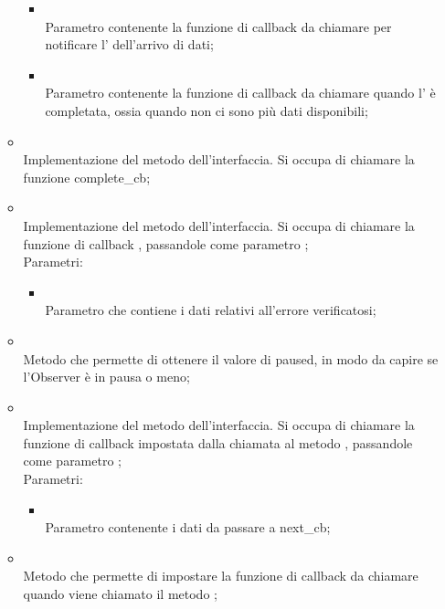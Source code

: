 \begin{itemize}
\begin{itemize}
\begin{itemize}
			\item {} \\
			Parametro contenente la funzione di callback da chiamare per notificare l' dell'arrivo di dati;
			\item {} \\
			Parametro contenente la funzione di callback da chiamare quando l' è completata, ossia quando non ci sono più dati disponibili;
		\end{itemize}
		\item[]  \\
		Implementazione del metodo dell'interfaccia. Si occupa di chiamare la funzione complete\_cb;\\
		\item[]  \\
		Implementazione del metodo dell'interfaccia. Si occupa di chiamare la funzione di callback , passandole come parametro ;\\
		Parametri:
		\begin{itemize}
			\item {} \\
			Parametro che contiene i dati relativi all'errore verificatosi;
		\end{itemize}
		\item[]  \\
		Metodo che permette di ottenere il valore di paused, in modo da capire se l'Observer è in pausa o meno;\\
		\item[]  \\
		Implementazione del metodo dell'interfaccia. Si occupa di chiamare la funzione di callback impostata dalla chiamata al metodo , passandole come parametro ;\\
		Parametri:
		\begin{itemize}
			\item {} \\
			Parametro contenente i dati da passare a next\_cb;
		\end{itemize}
		\item[]  \\
		Metodo che permette di impostare la funzione di callback da chiamare quando viene chiamato il metodo ;\\

\end{itemize}
\end{itemize}
